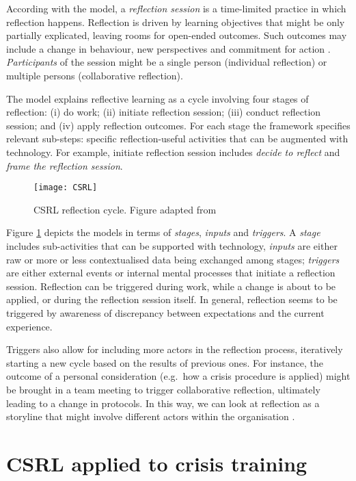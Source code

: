 According with the model, a \emph{reflection session} is a time-limited practice in which reflection happens. Reflection is driven by learning objectives that might be only partially explicated, leaving rooms for open-ended outcomes. Such outcomes may include a change in behaviour, new perspectives and commitment for action \autocite{boud1985reflection}. \emph{Participants} of the session might be a single person (individual reflection) or multiple persons (collaborative reflection).

The model explains reflective learning as a cycle involving four stages of reflection: (i) do work; (ii) initiate reflection session; (iii) conduct reflection session; and (iv) apply reflection outcomes. For each stage the framework specifies relevant sub-steps: specific reflection-useful activities that can be augmented with technology. For example, initiate reflection session includes \emph{decide to reflect} and \emph{frame the reflection session}.
\begin{figure}
	[ptb] \centering 
	\texttt{[image: CSRL]} \caption{CSRL reflection cycle. Figure adapted from \protect\autocite{Krogstie:2013kf}} \label{fig:csrl-model} 
\end{figure}

Figure \ref{fig:csrl-model} depicts the models in terms of \emph{stages}, \emph{inputs} and \emph{triggers}. A \emph{stage} includes sub-activities that can be supported with technology, \emph{inputs} are either raw or more or less contextualised data being exchanged among stages; \emph{triggers} are either external events or internal mental processes that initiate a reflection session. Reflection can be triggered during work, while a change is about to be applied, or during the reflection session itself. In general, reflection seems to be triggered by awareness of discrepancy between expectations and the current experience.

Triggers also allow for including more actors in the reflection process, iteratively starting a new cycle based on the results of previous ones. For instance, the outcome of a personal consideration (e.g.~how a crisis procedure is applied) might be brought in a team meeting to trigger collaborative reflection, ultimately leading to a change in protocols. In this way, we can look at reflection as a storyline that might involve different actors within the organisation \autocite{PrPK13}.

\section{CSRL applied to crisis training}\label{csrl-crisis}

